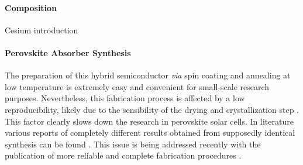 \paragraph{Composition}

Cesium introduction \cite{Bi2016,Saliba2016}



	\paragraph{Perovskite Absorber Synthesis}
	The preparation of this hybrid semiconductor \textsl{via} spin coating and annealing at low temperature is extremely easy and convenient for small-scale research purposes.
	Nevertheless, this fabrication process is affected by a low reproducibility, likely due to the sensibility of the drying and crystallization step \cite{Pockett2015}.
	This factor clearly slows down the research in perovskite solar cells.
	In literature various reports of completely different results obtained from supposedly identical synthesis can be found \cite{Pockett2015,Gottesman2014}.
	This issue is being addressed recently with the publication of more reliable and complete fabrication procedures \cite{Saliba2018}.

